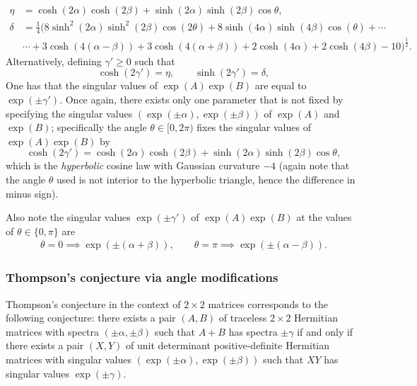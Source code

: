 \documentclass[notitlepage]{article}
\begin{document}
\begin{align}
    \eta&=\cosh(2 \alpha) \cosh(2 \beta) + \sinh (2\alpha) \sinh (2\beta)\cos \theta, \\
    \delta&=\frac{1}{4} \bigg(8 \sinh ^2(2 \alpha ) \sinh ^2(2 \beta ) \cos (2 \theta )+8 \sinh (4 \alpha ) \sinh (4 \beta ) \cos (\theta )+\cdots\\&\cdots+3 \cosh (4 (\alpha -\beta ))+3 \cosh (4 (\alpha +\beta ))+2 \cosh (4 \alpha )+2 \cosh (4 \beta )-10\bigg)^{\frac{1}{2}}.
\end{align}
Alternatively, defining $\gamma' \geq 0$ such that
\begin{equation}
    \cosh(2 \gamma') = \eta, \qquad \sinh(2 \gamma') = \delta,
\end{equation}
One has that the singular values of $\exp(A)\exp(B)$ are equal to $\exp(\pm \gamma')$.
Once again, there exists only one parameter that is not fixed by specifying the singular values $(\exp(\pm \alpha), \exp(\pm \beta))$ of $\exp(A)$ and $\exp(B)$; specifically the angle $\theta \in [0,2\pi)$ fixes the singular values of $\exp(A)\exp(B)$ by
\begin{equation}
    \cosh(2 \gamma') = \cosh(2 \alpha) \cosh(2 \beta) + \sinh (2\alpha) \sinh (2\beta)\cos \theta,
\end{equation}
which is the \textit{hyperbolic} cosine law with Gaussian curvature $-4$ (again note that the angle $\theta$ used is not interior to the hyperbolic triangle, hence the difference in minus sign).

Also note the singular values $\exp(\pm \gamma')$ of $\exp(A)\exp(B)$ at the values of $\theta \in \{0, \pi\}$ are
\begin{align}
    \theta = 0 \implies \exp(\pm(\alpha+\beta)), \qquad \theta = \pi \implies \exp(\pm(\alpha-\beta)).
\end{align}

\subsubsection{Thompson's conjecture via angle modifications}

Thompson's conjecture in the context of $2\times 2$ matrices corresponds to the following conjecture:
there exists a pair $(A,B)$ of traceless $2\times 2$ Hermitian matrices with spectra $(\pm\alpha, \pm\beta)$ such that $A + B$ has spectra $\pm \gamma$ if and only if there exists a pair $(X, Y)$ of unit determinant positive-definite Hermitian matrices with singular values $(\exp(\pm \alpha), \exp(\pm \beta))$ such that $X Y$ has singular values $\exp(\pm \gamma)$. 
\end{document}
